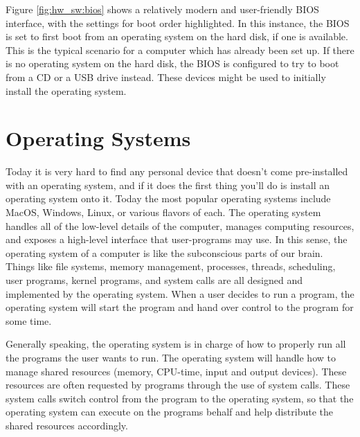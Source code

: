 Figure \ref{fig:hw_sw:bios} shows a relatively modern and user-friendly BIOS interface, with the settings
for boot order highlighted. In this instance, the BIOS is set to first boot from an operating system
on the hard disk, if one is available. This is the typical scenario for a computer which has already
been set up. If there is no operating system on the hard disk, the BIOS is configured to try to boot
from a CD or a USB drive instead. These devices might be used to initially install the operating system.

\section{Operating Systems}
Today it is very hard to find any personal device that doesn't come pre-installed with an
operating system, and if it does the first thing you'll do is install an operating system
onto it. Today the most popular operating systems include MacOS, Windows, Linux, or
various flavors of each. The operating system handles all of the low-level details of the
computer, manages computing resources, and exposes a high-level interface that user-programs
may use. In this sense, the operating system of a computer is like the subconscious parts
of our brain. Things like file systems, memory management, processes, threads, scheduling,
user programs, kernel programs, and system calls are all designed and implemented by the
operating system. When a user decides to run a program, the operating system will start
the program and hand over control to the program for some time.

Generally speaking, the operating system is in charge of how to properly run all the
programs the user wants to run. The operating system will handle how to manage
shared resources (memory, CPU-time, input and output devices). These resources are often
requested by programs through the use of system calls.
These system calls switch control from the program to the operating system,
so that the operating system can execute on the programs behalf and help
distribute the shared resources accordingly.

